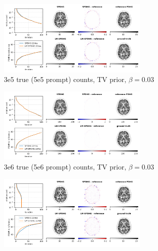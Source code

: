 \begin{figure}
  \centering
  \begin{subfigure}[]{1.0\textwidth}
    \centering
    \includegraphics[width=0.8\textwidth]{./figure3a_brain2d_counts_3.0E+05_seed_1_beta_3.0E-02_prior_TV_niter_ref_20000_fwhm_4.5_4.5_niter_100.png}
    \caption{3e5 true (5e5 prompt) counts, TV prior, $\beta = 0.03$}
  \end{subfigure}
  \vfill
  \begin{subfigure}[]{1.0\textwidth}
    \centering
    \includegraphics[width=0.8\textwidth]{./figure3b_brain2d_counts_3.0E+06_seed_1_beta_3.0E-02_prior_TV_niter_ref_20000_fwhm_4.5_4.5_niter_100.png}
    \caption{3e6 true (5e6 prompt) counts, TV prior, $\beta = 0.03$}
  \end{subfigure}
  \vfill
  \begin{subfigure}[]{1.0\textwidth}
    \centering
    \includegraphics[width=0.8\textwidth]{./figure3c_brain2d_counts_3.0E+05_seed_1_beta_1.0E-01_prior_DTV_niter_ref_20000_fwhm_4.5_4.5_niter_100.png}

\end{subfigure}
\end{figure}
